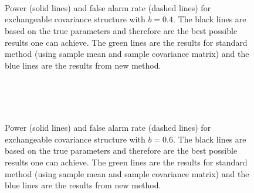 \begin{figure}[htp]
\centering
{}
\\
\\
\\
\caption{Power (solid lines) and false alarm rate (dashed lines) for exchangeable covariance structure with $b=0.4$. The black lines are based on the true parameters and therefore are the best possible results one can achieve. The green lines are the results for standard method (using sample mean and sample covariance matrix) and the blue lines are the results from new method.        
\label{sup.6}}
\end{figure}


\begin{figure}[htp]
\centering
{}
\\
\\
\\
\caption{Power (solid lines) and false alarm rate (dashed lines) for exchangeable covariance structure with $b=0.6$. The black lines are based on the true parameters and therefore are the best possible results one can achieve. The green lines are the results for standard method (using sample mean and sample covariance matrix) and the blue lines are the results from new method.        
\label{sup.7}}
\end{figure}



